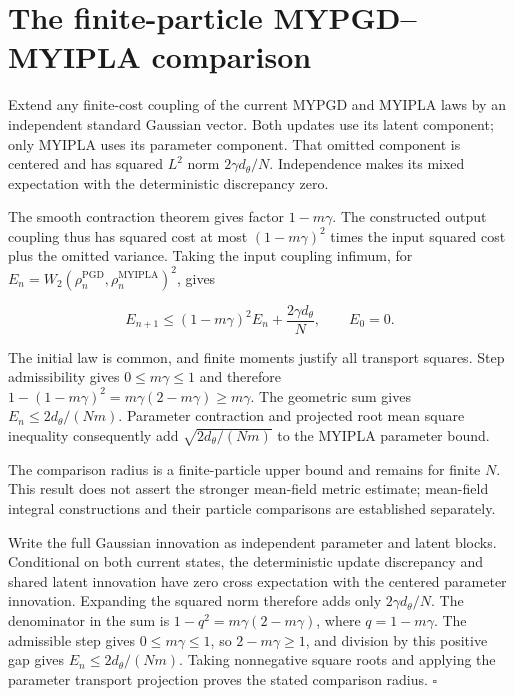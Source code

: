\documentclass[11pt,a4paper]{article}
\begin{document}
\section{\texorpdfstring{The finite-particle MYPGD–MYIPLA comparison}{The finite-particle MYPGD–MYIPLA comparison}}



Extend any finite-cost coupling of the current MYPGD and MYIPLA laws by an independent standard Gaussian vector. Both updates use its latent component; only MYIPLA uses its parameter component. That omitted component is centered and has squared \(L^2\) norm \(2\gamma d_\theta/N\). Independence makes its mixed expectation with the deterministic discrepancy zero.



The smooth contraction theorem \cite[Section~3.10.7]{LangevinLean2026ULASC} gives factor \(1-m\gamma\). The constructed output coupling thus has squared cost at most \((1-m\gamma)^2\) times the input squared cost plus the omitted variance. Taking the input coupling infimum, for \(E_n=W_2(\rho_n^{\mathrm{PGD}},\rho_n^{\mathrm{MYIPLA}})^2\), gives

\[E_{n+1}\le(1-m\gamma)^2E_n+\frac{2\gamma d_\theta}{N},\qquad E_0=0.\]

The initial law is common, and finite moments justify all transport squares. Step admissibility gives \(0\le m\gamma\le1\) and therefore \(1-(1-m\gamma)^2=m\gamma(2-m\gamma)\ge m\gamma\). The geometric sum gives \(E_n\le2d_\theta/(Nm)\). Parameter contraction \cite[Section~3.1.6]{LangevinLean2026IPLA} and projected root mean square inequality \cite[Section~3.48.9]{LangevinLean2026ULASC} consequently add \(\sqrt{2d_\theta/(Nm)}\) to the MYIPLA parameter bound.



The comparison radius is a finite-particle upper bound and remains for finite \(N\). This result does not assert the stronger mean-field metric estimate; mean-field integral constructions and their particle comparisons are established separately.




Write the full Gaussian innovation as independent parameter and latent blocks. Conditional on both current states, the deterministic update discrepancy and shared latent innovation have zero cross expectation with the centered parameter innovation. Expanding the squared norm therefore adds only \(2\gamma d_\theta/N\). The denominator in the sum is \(1-q^2=m\gamma(2-m\gamma)\), where \(q=1-m\gamma\). The admissible step gives \(0\le m\gamma\le1\), so \(2-m\gamma\ge1\), and division by this positive gap gives \(E_n\le2d_\theta/(Nm)\). Taking nonnegative square roots and applying the parameter transport projection proves the stated comparison radius. \(\square\)
\end{document}
